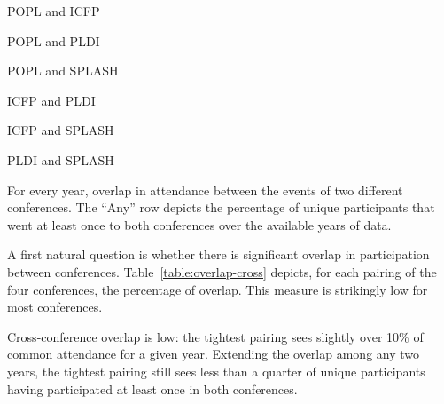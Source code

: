 \begin{table}
  \centering
  \begin{subtable}[b]{0.3\textwidth}
    \centering
    \caption{POPL and ICFP}
  \end{subtable}
  \begin{subtable}[b]{0.3\textwidth}
    \centering
    \caption{POPL and PLDI}
  \end{subtable}
  \begin{subtable}[b]{0.3\textwidth}
    \centering
    \caption{POPL and SPLASH}
  \end{subtable}
  \begin{subtable}[b]{0.3\textwidth}
    \centering
    \caption{ICFP and PLDI}
  \end{subtable}
  \begin{subtable}[b]{0.3\textwidth}
    \centering
    \caption{ICFP and SPLASH}
  \end{subtable}
  \begin{subtable}[b]{0.3\textwidth}
    \centering
    \caption{PLDI and SPLASH}
  \end{subtable}
   \caption{For every year, overlap in attendance between the events of two
     different conferences. The ``Any'' row depicts the percentage of unique
     participants that went at least once to both conferences over the available
     years of data.}
  \label{table:overlap-cross}
\end{table}

A first natural question is whether there is significant overlap
in participation between conferences.
Table~\ref{table:overlap-cross} depicts, for each pairing of the four
conferences, the percentage of overlap. This measure is strikingly
low for most conferences.

\begin{obs}
Cross-conference overlap is low: the tightest pairing sees slightly over
10\% of common attendance for a given year. Extending the overlap among any
two years, the tightest pairing still sees less than a quarter of unique
participants having participated at least once in both conferences.
  \label{obs:overlap-cross}
\end{obs}

